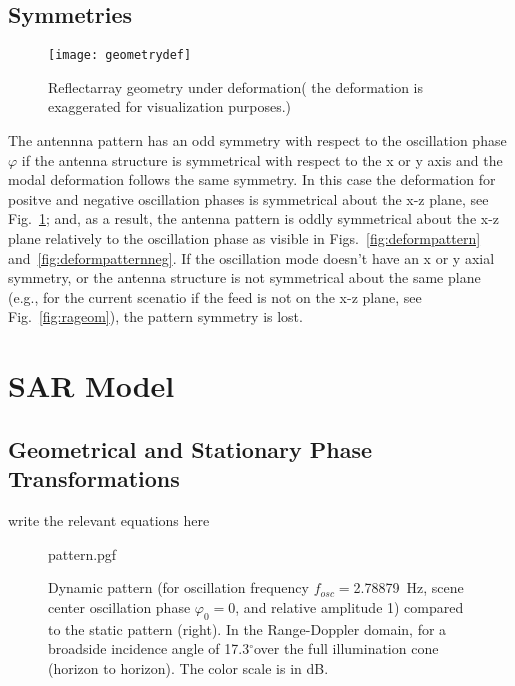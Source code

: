 \documentclass[11pt, a4paper]{scrartcl}
\newcommand{\degrees}{\ensuremath{^\circ}}
\begin{document}
    \subsection{Symmetries}
    \label{subsec:symmetries}
    \begin{figure}[!hbt]
        \texttt{[image: geometrydef]}
        \caption{Reflectarray geometry under deformation( the deformation is exaggerated for visualization purposes.)}
        \label{fig:radef}
    \end{figure}
    The antennna pattern has an odd symmetry with respect to the oscillation phase $\varphi$ if the antenna structure is
    symmetrical with respect to the x or y axis and the modal deformation follows the same symmetry.
    In this case the deformation for positve and negative oscillation phases is symmetrical about the x-z plane, see Fig.~\ref{fig:radef};
    and, as a result, the antenna pattern is oddly symmetrical about the x-z plane relatively to the oscillation phase
    as visible in Figs.~\ref{fig:deformpattern} and~\ref{fig:deformpatternneg}.
    If the oscillation mode doesn't have an x or y axial symmetry, or the antenna structure is not symmetrical about the
    same plane (e.g., for the current scenatio if the feed is not on the x-z plane, see Fig.~\ref{fig:rageom}),
    the pattern symmetry is lost.


    \section{SAR Model}
    \label{sec:sar_model}

    \subsection{Geometrical and Stationary Phase Transformations}
    \label{subsec:transformations}
    write the relevant equations here
    \begin{figure}[!htb]
        {pattern.pgf}
        \caption{Dynamic pattern (for oscillation frequency $f_{osc}=$2.78879~Hz, scene center oscillation phase
            $\varphi_0=0$, and relative amplitude 1) compared to the static pattern (right). In the Range-Doppler domain,
            for a broadside incidence angle of 17.3\degrees over the full illumination cone (horizon to horizon).
            The color scale is in dB.}
        \label{fig:RDpattern}
    \end{figure}
\end{document}

